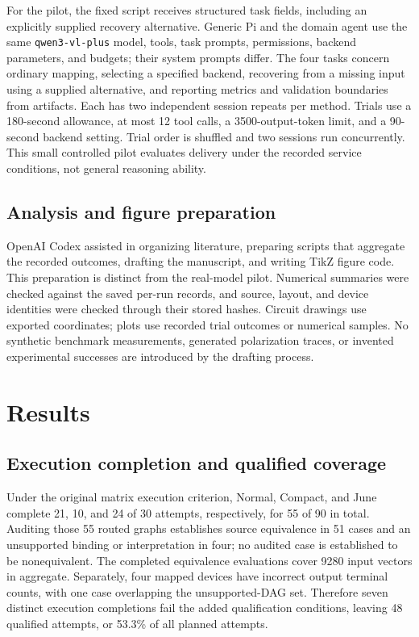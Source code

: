 \documentclass[ASNA,twocolumn]{USG}
\begin{document}
For the pilot, the fixed script receives structured task fields, including an explicitly supplied recovery alternative. Generic Pi and the domain agent use the same \texttt{qwen3-vl-plus} model, tools, task prompts, permissions, backend parameters, and budgets; their system prompts differ. The four tasks concern ordinary mapping, selecting a specified backend, recovering from a missing input using a supplied alternative, and reporting metrics and validation boundaries from artifacts. Each has two independent session repeats per method. Trials use a 180-second allowance, at most 12 tool calls, a 3500-output-token limit, and a 90-second backend setting. Trial order is shuffled and two sessions run concurrently. This small controlled pilot evaluates delivery under the recorded service conditions, not general reasoning ability.

\subsection{Analysis and figure preparation}
OpenAI Codex assisted in organizing literature, preparing scripts that aggregate the recorded outcomes, drafting the manuscript, and writing TikZ figure code. This preparation is distinct from the real-model pilot. Numerical summaries were checked against the saved per-run records, and source, layout, and device identities were checked through their stored hashes. Circuit drawings use exported coordinates; plots use recorded trial outcomes or numerical samples. No synthetic benchmark measurements, generated polarization traces, or invented experimental successes are introduced by the drafting process.

\section{Results}\label{sec:results}
\subsection{Execution completion and qualified coverage}
Under the original matrix execution criterion, Normal, Compact, and June complete 21, 10, and 24 of 30 attempts, respectively, for 55 of 90 in total. Auditing those 55 routed graphs establishes source equivalence in 51 cases and an unsupported binding or interpretation in four; no audited case is established to be nonequivalent. The completed equivalence evaluations cover 9280 input vectors in aggregate. Separately, four mapped devices have incorrect output terminal counts, with one case overlapping the unsupported-DAG set. Therefore seven distinct execution completions fail the added qualification conditions, leaving 48 qualified attempts, or 53.3\% of all planned attempts.
\end{document}
